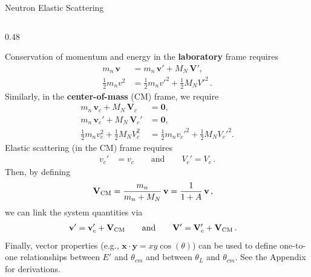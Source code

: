 \documentclass[aspectratio=1610]{beamer}
\let\oldfootnotesize\footnotesize
\renewcommand*{\footnotesize}{\oldfootnotesize\tiny}
\begin{document}
\begin{frame}{Neutron Elastic Scattering}
\begin{columns}[T,onlytextwidth]
\begin{column}{0.48\textwidth}
 
{\footnotesize
Conservation of momentum and energy in the {\bf laboratory} frame requires
\begin{align*}
m_n \,\mathbf{v} &= m_n \,\mathbf{v}' + M_N \,\mathbf{V}', \\
\tfrac{1}{2}m_n v^2 &= \tfrac{1}{2}m_n v'^2 + \tfrac{1}{2}M_N V'^2  \, .
\end{align*}
Similarly, in the {\bf center-of-mass} (CM) frame, we require
\begin{align*}
m_n \,\mathbf{v}_c + M_N \,\mathbf{V}_c &= \mathbf{0},\\
m_n \,\mathbf{v}_c' + M_N \,\mathbf{V}_c' &= \mathbf{0},\\
\tfrac{1}{2}m_n v_c^2 + \tfrac{1}{2}M_N V_c^2
&= \tfrac{1}{2}m_n v_c'^2 + \tfrac{1}{2}M_N V_c'^2.
\end{align*}
Elastic scattering (in the CM) frame requires
\begin{align*}
v_c' &= v_c \qquad \text{and} \qquad V_c' = V_c \, .
\end{align*}
Then, by defining
\begin{align*}
\mathbf{V}_{\rm CM} &= \frac{m_n}{m_n+M_N}\,\mathbf{v}
= \frac{1}{1+A}\,\mathbf{v} \, ,
\end{align*}
we can link the system quantities via 
\begin{align*}
\mathbf{v}' &= \mathbf{v}_c' + \mathbf{V}_{\rm CM} \qquad \text{and} \qquad
\mathbf{V}' = \mathbf{V}_c' + \mathbf{V}_{\rm CM} \, .
\end{align*}
Finally, vector properties (e.g., $\mathbf{x}\cdot \mathbf{y}=xy\cos(\theta)$)
can be used to define one-to-one relationships between $E'$ and $\theta_{cm}$
and between $\theta_L$ and $\theta_{cm}$.
See the Appendix for derivations.

}
\end{column}

\end{columns}
\end{frame}
\end{document}
